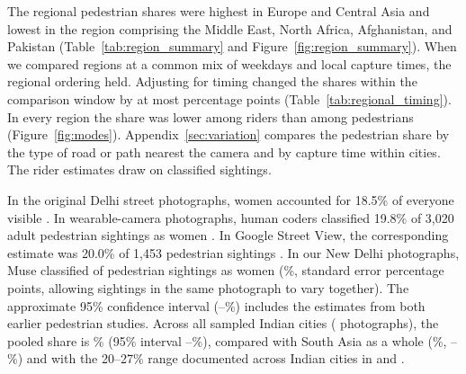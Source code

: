 \documentclass[11pt]{article}
\begin{document}
The regional pedestrian shares were highest in Europe and Central Asia and lowest in the region comprising the Middle East, North Africa, Afghanistan, and Pakistan (Table~\ref{tab:region_summary} and Figure~\ref{fig:region_summary}). When we compared regions at a common mix of weekdays and local capture times, the regional ordering held. Adjusting for timing changed the shares within the comparison window by at most \MaxTimingShift{} percentage points (Table~\ref{tab:regional_timing}). In every region the share was lower among riders than among pedestrians (Figure~\ref{fig:modes}). Appendix~\ref{sec:variation} compares the pedestrian share by the type of road or path nearest the camera and by capture time within cities. The rider estimates draw on \TotalRiders{} classified sightings.

In the original Delhi street photographs, women accounted for 18.5\% of everyone visible \citep{sood2017womencount}. In wearable-camera photographs, human coders classified 19.8\% of 3,020 adult pedestrian sightings as women \citep{karekurve2026streetscope}. In Google Street View, the corresponding estimate was 20.0\% of 1,453 pedestrian sightings \citep{sood2026streetsight}. In our New Delhi photographs, Muse classified \DelhiWomen{} of \DelhiPedestrians{} pedestrian sightings as women (\DelhiShare\%, standard error \DelhiSE{} percentage points, allowing sightings in the same photograph to vary together). The approximate 95\% confidence interval (\DelhiLo--\DelhiHi\%) includes the estimates from both earlier pedestrian studies. Across all \IndiaCities{} sampled Indian cities (\IndiaImages{} photographs), the pooled share is \IndiaPedShare\% (95\% interval \IndiaPedCILo--\IndiaPedCIHi\%), compared with South Asia as a whole (\SouthAsiaPedShare\%, \SouthAsiaPedCILo--\SouthAsiaPedCIHi\%) and with the 20--27\% range documented across Indian cities in \citet{karekurve2026streetscope} and \citet{sood2026streetsight}.
\end{document}
